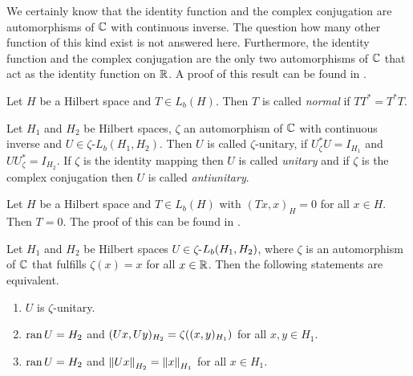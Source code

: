 \begin{remark}
	We certainly know that the identity function and the complex conjugation are automorphisms of $\C$ with continuous inverse. The question how many other function of this kind exist is not answered here. Furthermore, the identity function and the complex conjugation are the only two automorphisms of $\C$ that act as the identity function on $\R$. A proof of this result can be found in \cite[p. 41]{LinAG1&2}. 
\end{remark}


\begin{definition}
	Let $H$ be a Hilbert space and $T\in L_b(H)$. Then $T$ is called \textit{normal} if $TT^\ast = T^\ast T$. 
\end{definition}


\begin{definition}
	Let $H_1$ and $H_2$ be Hilbert spaces, $\zeta$ an automorphism of $\C$ with continuous inverse and $U \in \zeta$-$L_b(H_1, H_2)$. Then $U$ is called $\zeta$-unitary, if $U_\zeta^\ast U = I_{H_1}$ and $U U_\zeta^\ast = I_{H_2}$. If $\zeta$ is the identity mapping then $U$ is called \textit{unitary} and if $\zeta$ is the complex conjugation then $U$ is called \textit{antiunitary}.
\end{definition}


\begin{remark}\label{remark:operator_equivalence_hilbert}
		Let $H$ be a Hilbert space and $T\in L_b(H)$ with $(Tx,x)_H = 0$ for all $x \in H$. Then $T = 0$. The proof of this can be found in \cite[p.142]{FAna1}.
\end{remark}


\begin{proposition} \label{prop:unitary}
	Let $H_1$ and $H_2$ be Hilbert spaces $U \in \zeta$-$L_b\pbraces{H_1, H_2}$, where $\zeta$ is an automorphism of $\C$ that fulfills $\zeta(x) = x$ for all $x \in \R$. Then the following statements are equivalent.
	\begin{enumerate}[label = (\roman*)]
		\item $U$ is $\zeta$-unitary. 
		\item $\ran U = H_2$ and $(Ux , Uy)_{H_2} = \zeta\pbraces{(x,y)_{H_1}}$ for all $x,y \in H_1$.
		\item $\ran U = H_2$ and $\norm[H_2]{Ux} = \norm[H_1]{x}$ for all $x \in H_1$. 
	\end{enumerate}
\end{proposition}

